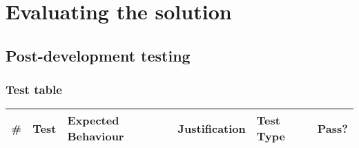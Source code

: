 \chapter{Evaluating the solution}

\section{Post-development testing}

\subsection{Test table}

\begin{longtable}{|p{}|p{}|p{}|p{}|p{}|p{}|}
	\hline
	\textbf{\#} & \textbf{Test} & \textbf{Expected Behaviour} & \textbf{Justification} & \textbf{Test Type} & \textbf{Pass?} \\
	\hline
	\endhead
	

\end{longtable}
